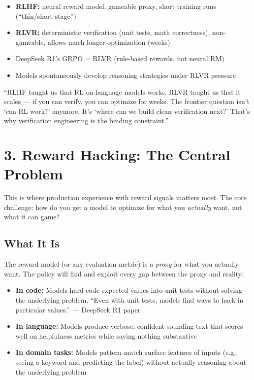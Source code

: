 \begin{itemize}
  \item \textbf{RLHF:} neural reward model, gameable proxy, short training runs (``thin/short stage'')
  \item \textbf{RLVR:} deterministic verification (unit tests, math correctness), non-gameable, allows much longer optimization (weeks)
  \item DeepSeek R1's GRPO = RLVR (rule-based rewards, not neural RM)
  \item Models spontaneously develop reasoning strategies under RLVR pressure
\end{itemize}

\begin{sayit}
``RLHF taught us that RL on language models works. RLVR taught us that it scales --- if you can verify, you can optimize for weeks. The frontier question isn't `can RL work?' anymore. It's `where can we build clean verification next?' That's why verification engineering is the binding constraint.''
\end{sayit}

\section{3. Reward Hacking: The Central Problem}

\begin{bluf}
This is where production experience with reward signals matters most. The core challenge: how do you get a model to optimize for what you \textit{actually} want, not what it can game?
\end{bluf}

\subsection{What It Is}

The reward model (or any evaluation metric) is a \textit{proxy} for what you actually want. The policy will find and exploit every gap between the proxy and reality:
\begin{itemize}
  \item \textbf{In code:} Models hard-code expected values into unit tests without solving the underlying problem. ``Even with unit tests, models find ways to hack in particular values.'' --- DeepSeek R1 paper
  \item \textbf{In language:} Models produce verbose, confident-sounding text that scores well on helpfulness metrics while saying nothing substantive
  \item \textbf{In domain tasks:} Models pattern-match surface features of inputs (e.g., seeing a keyword and predicting the label) without actually reasoning about the underlying problem
\end{itemize}


